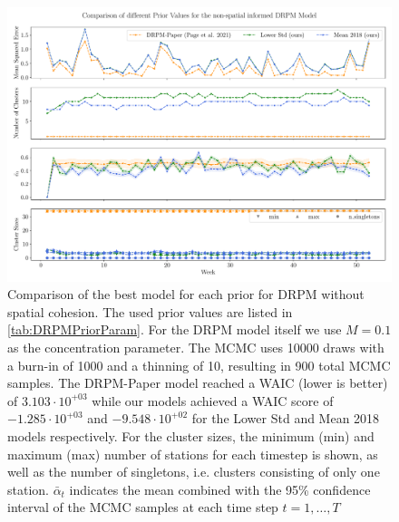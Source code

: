 \documentclass[12pt,a4paper]{article}
\begin{document}
\begin{figure}
    \centering
    \includegraphics[width=.95\linewidth]{./imgs/drpm/drpm_base_models_comparison.pdf}
    \caption{Comparison of the best model for each prior for DRPM without spatial cohesion.
    The used prior values are listed in \cref{tab:DRPMPriorParam}. For the DRPM model itself we use
    $M=0.1$ as the concentration parameter. The MCMC uses 10000 draws with a burn-in of 1000 and a
    thinning of 10, resulting in 900 total MCMC samples. The DRPM-Paper model reached a WAIC (lower is better) of
    $3.103 \cdot 10^{+03}$ while our models achieved a WAIC score of $-1.285 \cdot 10^{+03}$ and
    $-9.548 \cdot 10^{+02}$ for the Lower Std and Mean 2018 models respectively. For the cluster sizes,
    the minimum (min) and maximum (max) number of stations for each timestep is shown, as well as the number of
    singletons, i.e. clusters consisting of only one station.
    $\bar{\alpha}_t$ indicates the mean combined with the 95\% confidence 
    interval of the MCMC
    samples at each time step $t=1, \ldots, T$}
    \label{fig:drpm_base_models_comparison}
\end{figure}
\end{document}
